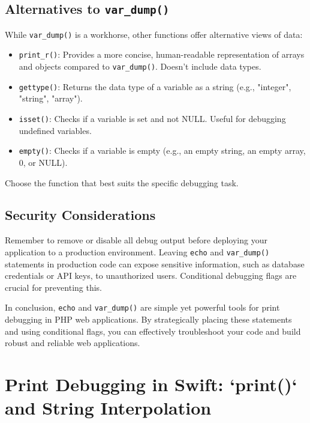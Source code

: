 \documentclass{article}
\begin{document}
{{{{\subsection*{Alternatives to \texttt{var\_dump()}}

While \texttt{var\_dump()} is a workhorse, other functions offer alternative views of data:

\begin{itemize}
    \item \texttt{print\_r()}:  Provides a more concise, human-readable representation of arrays and objects compared to \texttt{var\_dump()}. Doesn't include data types.
    \item \texttt{gettype()}: Returns the data type of a variable as a string (e.g., "integer", "string", "array").
    \item \texttt{isset()}: Checks if a variable is set and not NULL.  Useful for debugging undefined variables.
    \item \texttt{empty()}: Checks if a variable is empty (e.g., an empty string, an empty array, 0, or NULL).
\end{itemize}

Choose the function that best suits the specific debugging task.

\subsection*{Security Considerations}

Remember to remove or disable all debug output before deploying your application to a production environment. Leaving \texttt{echo} and \texttt{var\_dump()} statements in production code can expose sensitive information, such as database credentials or API keys, to unauthorized users. Conditional debugging flags are crucial for preventing this.

In conclusion, \texttt{echo} and \texttt{var\_dump()} are simple yet powerful tools for print debugging in PHP web applications. By strategically placing these statements and using conditional flags, you can effectively troubleshoot your code and build robust and reliable web applications.

\newpage

\section*{Print Debugging in Swift: `print()` and String Interpolation} %
\label{chapter-9-9-Print_Debugging_in_Swift___print____and}

}}}}
\end{document}
